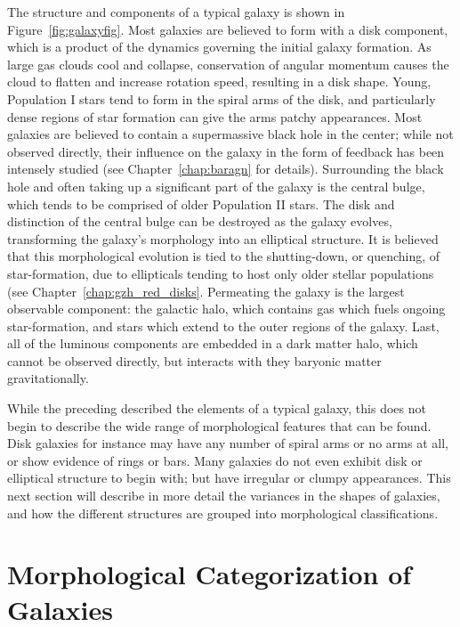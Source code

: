 The structure and components of a typical galaxy is shown in Figure~\ref{fig:galaxyfig}. Most galaxies are believed to form with a disk component, which is a product of the dynamics governing the initial galaxy formation. As large gas clouds cool and collapse, conservation of angular momentum causes the cloud to flatten and increase rotation speed, resulting in a disk shape. Young, Population I stars tend to form in the spiral arms of the disk, and particularly dense regions of star formation can give the arms patchy appearances. Most galaxies are believed to contain a supermassive black hole in the center; while not observed directly, their influence on the galaxy in the form of feedback has been intensely studied (see Chapter~\ref{chap:baragn} for details). Surrounding the black hole and often taking up a significant part of the galaxy is the central bulge, which tends to be comprised of older Population II stars. The disk and distinction of the central bulge can be destroyed as the galaxy evolves, transforming the galaxy's morphology into an elliptical structure. It is believed that this morphological evolution is tied to the shutting-down, or quenching, of star-formation, due to ellipticals tending to host only older stellar populations (see Chapter~\ref{chap:gzh_red_disks}. Permeating the galaxy is the largest observable component: the galactic halo, which contains gas which fuels ongoing star-formation, and stars which extend to the outer regions of the galaxy. Last, all of the luminous components are embedded in a dark matter halo, which cannot be observed directly, but interacts with they baryonic matter gravitationally. 

While the preceding described the elements of a typical galaxy, this does not begin to describe the wide range of morphological features that can be found. Disk galaxies for instance may have any number of spiral arms or no arms at all, or show evidence of rings or bars. Many galaxies do not even exhibit disk or elliptical structure to begin with; but have irregular or clumpy appearances. This next section will describe in more detail the variances in the shapes of galaxies, and how the different structures are grouped into morphological classifications. 

\section{Morphological Categorization of Galaxies}

